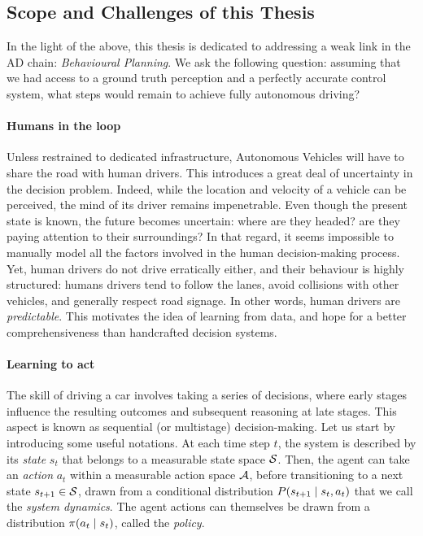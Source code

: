 \subsection{Scope and Challenges of this Thesis}
\label{sec:scopes-and-challenges}

In the light of the above, this thesis is dedicated to addressing a weak link in the \acl*{AD} chain: \emph{Behavioural Planning}.  We ask the following question: assuming that we had access to a ground truth perception and a perfectly accurate control system, what steps would remain to achieve fully autonomous driving?


\paragraph{Humans in the loop}

Unless restrained to dedicated infrastructure, Autonomous Vehicles will have to share the road with human drivers. This introduces a great deal of uncertainty in the decision problem. Indeed, while the location and velocity of a vehicle can be perceived, the mind of its driver remains impenetrable. Even though the present state is known, the future becomes uncertain: where are they headed? are they paying attention to their surroundings? In that regard, it seems impossible to manually model all the factors involved in the human decision-making process. Yet, human drivers do not drive erratically either, and their behaviour is highly structured: humans drivers tend to follow the lanes, avoid collisions with other vehicles, and generally respect road signage. In other words, human drivers are \emph{predictable}. This motivates the idea of learning from data, and hope for a better comprehensiveness than handcrafted decision systems.%

\paragraph{Learning to act}

The skill of driving a car involves taking a series of decisions, where early stages influence the resulting outcomes and subsequent reasoning at late stages. This aspect is known as sequential (or multistage) decision-making. Let us start by introducing some useful notations. At each time step $t$, the system is described by its \emph{state} $s_t$ that belongs to a measurable state space $\mathcal{S}$. Then, the agent can take an \emph{action} $a_t$ within a measurable action space $\mathcal{A}$, before transitioning to a next state $s_{t+1}\in\mathcal{S}$, drawn from a conditional distribution $P\lparen s_{t+1} \mid s_t, a_t\rparen$ that we call the \emph{system dynamics}. The agent actions can themselves be drawn from a distribution $\pi\lparen a_t\mid s_t\rparen$, called the \emph{policy}.

